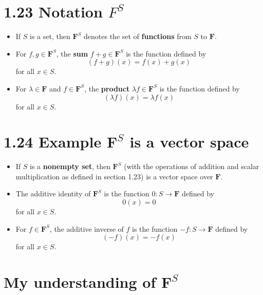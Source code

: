\documentclass[12pt, letterpaper, oneside]{book}
\begin{document}
\section{1.23 Notation $F^S$}

\begin{itemize}
  \item If $S$ is a set, then $\mathbf{F}^S$ denotes the set of
    \textbf{functions} from $S$ to $\mathbf{F}$.
  \item For $f,g \in \mathbf{F}^S$, the \textbf{sum} $f + g \in \mathbf{F}^S$
    is the function defined by
      \[ (f + g)(x) = f(x) + g(x) \]
    for all $x \in S$.
  \item For $\lambda \in \mathbf{F}$ and $f \in \mathbf{F}^S$, the
    \textbf{product} $\lambda f \in \mathbf{F}^S$ is the function defined by
      \[ (\lambda f)(x) = \lambda f(x) \]
    for all $x \in S$.
\end{itemize}

\section{1.24 Example $\mathbf{F}^S$ is a vector space}

\begin{itemize}
  \item If $S$ is a \textbf{nonempty set}, then $\mathbf{F}^S$ (with the
   operations of addition and scalar multiplication as defined in section 1.23)
   is a vector space over $\mathbf{F}$.
  \item The additive identity of $\mathbf{F}^S$ is the function $0:
    S \rightarrow \mathbf{F}$ defined by
      \[ 0(x) = 0 \]
    for all $x \in S$.
  \item For $f \in \mathbf{F}^S$, the additive inverse of $f$ is the function
    $-f: S \rightarrow \mathbf{F}$ defined by
      \[ (-f)(x) = -f(x) \]
    for all $x \in S$.
\end{itemize}

\section{My understanding of $\mathbf{F}^S$} \label{F^S understanding}
\end{document}
